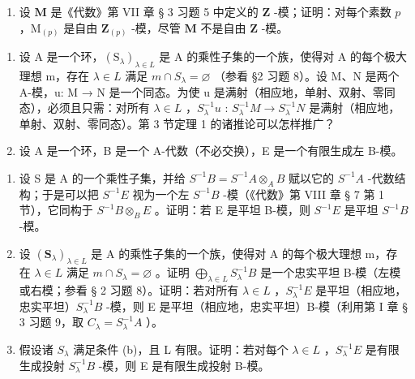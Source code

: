 \begin{enumerate}
\def\labelenumi{(\alph{enumi})}
\setcounter{enumi}{1}
\tightlist
\item
  设 \(\mathbf{M}\) 是《代数》第 VII 章 § 3 习题 5 中定义的 \(\mathbf{Z}\) -模；证明：对每个素数 \(p\) ，\(\mathrm{M}_{(p)}\) 是自由 \(\mathbf{Z}_{(p)}\) -模，尽管 \(\mathbf{M}\) 不是自由 \(\mathbf{Z}\) -模。
\end{enumerate}

\begin{enumerate}
\def\labelenumi{\arabic{enumi}.}
\setcounter{enumi}{6}
\item
  设 A 是一个环，\((\mathrm{S}_{\lambda})_{\lambda \in L}\) 是 A 的乘性子集的一个族，使得对 A 的每个极大理想 m，存在 \(\lambda \in L\) 满足 \(m \cap S_{\lambda} = \varnothing\) （参看 §2 习题 8）。设 M、N 是两个 A-模，u: M → N 是一个同态。为使 u 是满射（相应地，单射、双射、零同态），必须且只需：对所有 \(\lambda \in L\) ，\(S_{\lambda}^{-1}u\) : \(S_{\lambda}^{-1}M \to S_{\lambda}^{-1}N\) 是满射（相应地，单射、双射、零同态）。第 3 节定理 1 的诸推论可以怎样推广？
\item
  设 A 是一个环，B 是一个 A-代数（不必交换），E 是一个有限生成左 B-模。
\end{enumerate}

\begin{enumerate}
\def\labelenumi{(\alph{enumi})}
\item
  设 S 是 A 的一个乘性子集，并给 \(S^{-1}B = S^{-1}A \otimes_{A} B\) 赋以它的 \(S^{-1}A\) -代数结构；于是可以把 \(S^{-1}E\) 视为一个左 \(S^{-1}B\) -模（《代数》第 VIII 章 § 7 第 1 节），它同构于 \(S^{-1}B \otimes_{B} E\) 。证明：若 E 是平坦 B-模，则 \(S^{-1}E\) 是平坦 \(S^{-1}B\) -模。
\item
  设 \((\mathbf{S}_{\lambda})_{\lambda \in L}\) 是 A 的乘性子集的一个族，使得对 A 的每个极大理想 m，存在 \(\lambda \in L\) 满足 \(m \cap S_{\lambda} = \varnothing\) 。证明 \(\bigoplus_{\lambda \in L} S_{\lambda}^{-1} B\) 是一个忠实平坦 B-模（左模或右模；参看 § 2 习题 8）。证明：若对所有 \(\lambda \in L\) ，\(S_{\lambda}^{-1} E\) 是平坦（相应地，忠实平坦）\(S_{\lambda}^{-1} B\) -模，则 E 是平坦（相应地，忠实平坦）B-模（利用第 I 章 § 3 习题 9，取 \(C_{\lambda} = S_{\lambda}^{-1} A\) ）。
\item
  假设诸 \(S_{\lambda}\) 满足条件 (b)，且 L 有限。证明：若对每个 \(\lambda \in L\) ，\(S_{\lambda}^{-1}E\) 是有限生成投射 \(S_{\lambda}^{-1}B\) -模，则 E 是有限生成投射 B-模。
\end{enumerate}

